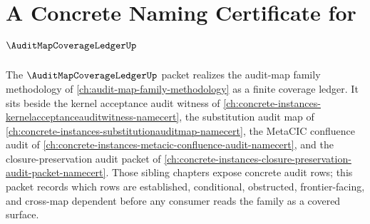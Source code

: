 \chapter{A Concrete Naming Certificate for $\AuditMapCoverageLedgerUp$}
\label{ch:concrete-instances-audit-map-coverage-ledger-namecert}

The $\AuditMapCoverageLedgerUp$ packet realizes the audit-map family methodology of \autoref{ch:audit-map-family-methodology} as a finite coverage ledger. It sits beside the kernel acceptance audit witness of \autoref{ch:concrete-instances-kernelacceptanceauditwitness-namecert}, the substitution audit map of \autoref{ch:concrete-instances-substitutionauditmap-namecert}, the MetaCIC confluence audit of \autoref{ch:concrete-instances-metacic-confluence-audit-namecert}, and the closure-preservation audit packet of \autoref{ch:concrete-instances-closure-preservation-audit-packet-namecert}. Those sibling chapters expose concrete audit rows; this packet records which rows are established, conditional, obstructed, frontier-facing, and cross-map dependent before any consumer reads the family as a covered surface.

